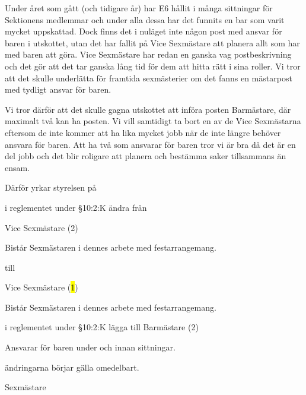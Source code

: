 \documentclass[../_main/handlingar.tex]{subfiles}
\begin{document}
Under året som gått (och tidigare år) har E6 hållit i många sittningar för Sektionens medlemmar och under alla dessa har det funnits en bar som varit mycket uppskattad. Dock finns det i nuläget inte någon post med ansvar för baren i utskottet, utan det har fallit på Vice Sexmästare att planera allt som har med baren att göra. Vice Sexmästare har redan en ganska vag postbeskrivning och det gör att det tar ganska lång tid för dem att hitta rätt i sina roller. Vi tror att det skulle underlätta för framtida sexmästerier om det fanns en mästarpost med tydligt ansvar för baren.

Vi tror därför att det skulle gagna utskottet att införa posten Barmästare, där maximalt två kan ha posten. Vi vill samtidigt ta bort en av de Vice Sexmästarna eftersom de inte kommer att ha lika mycket jobb när de inte längre behöver ansvara för baren. Att ha två som ansvarar för baren tror vi är bra då det är en del jobb och det blir roligare att planera och bestämma saker tillsammans än ensam.

Därför yrkar styrelsen på
\begin{attsatser}
    \att i reglementet under \S10:2:K ändra från\par
      Vice Sexmästare (2)
        \begin{tightdashlist}
            \item Bistår Sexmästaren i dennes arbete med festarrangemang.
        \end{tightdashlist}

        till

          Vice Sexmästare (\hl{1})
          \begin{tightdashlist}
              \item Bistår Sexmästaren i dennes arbete med festarrangemang.
          \end{tightdashlist}

      \att i reglementet under §10:2:K lägga till
      Barmästare (2)
      \begin{tightdashlist}
          \item Ansvarar för baren under och innan sittningar.
      \end{tightdashlist}
      \att ändringarna börjar gälla omedelbart.
\end{attsatser}

\begin{signatures}{1}
    \ist
    \signature{Linnea Sjödahl}{Sexmästare}
\end{signatures}
\end{document}
